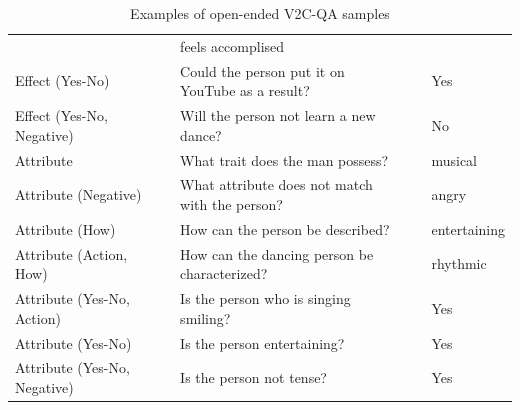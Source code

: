 \begin{table}[t]
{\begin{tabular}{lclcl}
            && feels accomplised\\
        Effect (Yes-No)
            && Could the person put it on YouTube as a result?
            && Yes\\
        Effect (Yes-No, Negative)
            && Will the person not learn a new dance?
            && No\\
        \midrule 
        Attribute
            && What trait does the man possess?
            && musical\\
        Attribute (Negative)
            && What attribute does not match with the person?
            && angry\\
        Attribute (How)
            && How can the person be described?
            && entertaining\\
        Attribute (Action, How)
            && How can the dancing person be characterized?
            && rhythmic\\
        Attribute (Yes-No, Action)
            && Is the person who is singing smiling?
            && Yes\\
        Attribute (Yes-No)
            && Is the person entertaining?
            && Yes\\
        Attribute (Yes-No, Negative)
            && Is the person not tense?
            && Yes\\
        \bottomrule
    \end{tabular}
    }
    \caption{Examples of open-ended V2C-QA samples}
    \label{tab:v2cqa_data}
\end{table}